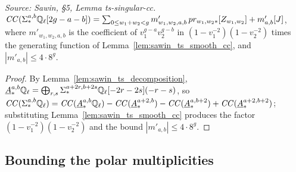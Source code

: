 \begin{lemma}
  \label{lem:sawin_ts_singular_cc}
  \textit{Source: Sawin, §5, Lemma ts-singular-cc.}
  $\mathit{CC}(\Sigma^{a,b}_*\mathbb{Q}_\ell[2g-a-b]) = \sum_{0\le w_1+w_2<g}
  m'_{w_1,w_2,a,b}\,pr_{w_1,w_2*}[Z_{w_1,w_2}] + m'_{a,b}[J]$, where
  $m'_{w_1,w_2,a,b}$ is the coefficient of $v_1^{g-a}v_2^{g-b}$ in
  $(1-v_1^{-2})(1-v_2^{-2})$ times the generating function of
  Lemma~\ref{lem:sawin_ts_smooth_cc}, and $|m'_{a,b}|\le 4\cdot 8^g$.
\end{lemma}
\begin{proof}
  By Lemma~\ref{lem:sawin_ts_decomposition},
  $\underline A^{a,b}_*\mathbb{Q}_\ell = \bigoplus_{r,s}\Sigma^{a+2r,b+2s}_*\mathbb{Q}_\ell[-2r-2s](-r-s)$,
  so $\mathit{CC}(\Sigma^{a,b}_*\mathbb{Q}_\ell) = \mathit{CC}(\underline A^{a,b}_*\mathbb{Q}_\ell) -
  \mathit{CC}(\underline A^{a+2,b}_*) - \mathit{CC}(\underline A^{a,b+2}_*) +
  \mathit{CC}(\underline A^{a+2,b+2}_*)$; substituting
  Lemma~\ref{lem:sawin_ts_smooth_cc} produces the factor $(1-v_1^{-2})(1-v_2^{-2})$
  and the bound $|m'_{a,b}|\le 4\cdot 8^g$.
\end{proof}

\subsection{Bounding the polar multiplicities}

